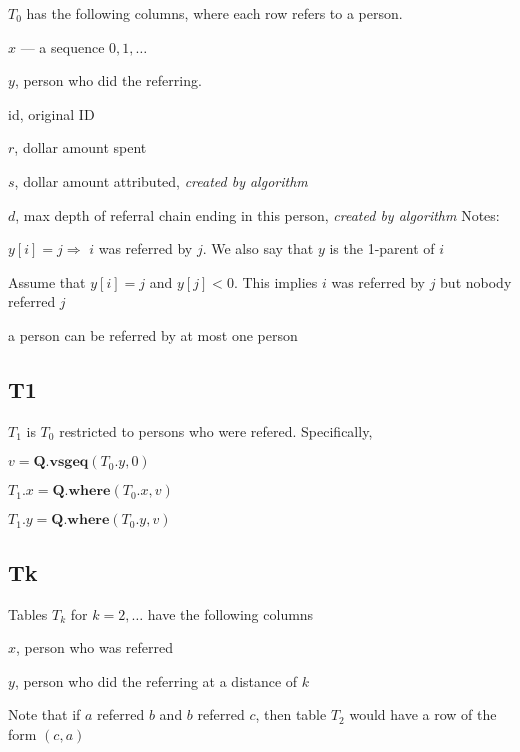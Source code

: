 \(T_0\) has the following columns, where each row refers to a person.
\be
\item \(x\) --- a sequence \(0, 1, \ldots\)
\item \(y\), person who did the referring. 
\item id, original ID 
\item \(r\), dollar amount spent 
\item \(s\), dollar amount attributed, {\em created by algorithm}
\item \(d\), max depth of referral chain ending in this person, {\em created by algorithm}
\ee
Notes:
\bi
\item \(y[i] = j \Rightarrow\) \(i\) was referred by \(j\). 
We also say that \(y\) is the 1-parent of \(i\)
\item 
Assume that \(y[i] = j\) and \(y[j] < 0\). 
This implies \(i\) was referred by \(j\) but nobody referred \(j\)
\item a person can be referred by at most one person 
\ei

\subsection{T1}

\(T_1\) is \(T_0\) restricted to persons who were refered. Specifically,
\bi
\item \(v = \mathbf{Q.vsgeq}(T_0.y, 0)\)
\item \(T_1.x = \mathbf{Q.where}(T_0.x, v)\)
\item \(T_1.y = \mathbf{Q.where}(T_0.y, v)\)
\ei

\subsection{Tk}

Tables \(T_k\) for \(k =  2, \ldots\) have the following columns
\be
\item \(x\), person who was referred
\item \(y\), person who did the referring at a distance of \(k\)
\ee

Note that if \(a\) referred \(b\) and \(b\) referred \(c\), then table \(T_2\)
would have a row of the form \((c, a)\)

